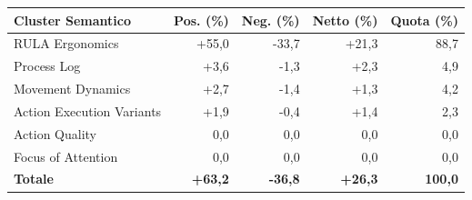 \begin{tabular*}{\linewidth}{@{}l@{\extracolsep{\fill}}rrrr@{}}
\toprule
\textbf{Cluster Semantico} & \textbf{Pos. (\%)} & \textbf{Neg. (\%)} & \textbf{Netto (\%)} & \textbf{Quota (\%)} \\
\midrule
RULA Ergonomics & +55{,}0 & -33{,}7 & +21{,}3 & 88{,}7 \\
Process Log & +3{,}6 & -1{,}3 & +2{,}3 & 4{,}9 \\
Movement Dynamics & +2{,}7 & -1{,}4 & +1{,}3 & 4{,}2 \\
Action Execution Variants & +1{,}9 & -0{,}4 & +1{,}4 & 2{,}3 \\
Action Quality & 0{,}0 & 0{,}0 & 0{,}0 & 0{,}0 \\
Focus of Attention & 0{,}0 & 0{,}0 & 0{,}0 & 0{,}0 \\
\midrule
\textbf{Totale} & \textbf{+63{,}2} & \textbf{-36{,}8} & \textbf{+26{,}3} & \textbf{100{,}0} \\
\bottomrule
\end{tabular*}
